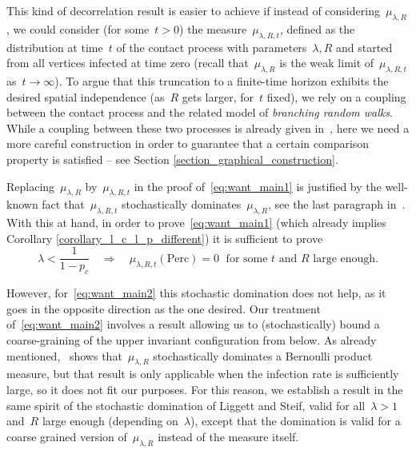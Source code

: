 \documentclass[a4paper,12pt]{article}
\begin{document}
\smallskip


This kind of decorrelation result is easier to achieve if instead of considering~$\mu_{\lambda,R}$, we could consider (for some~$t > 0$) the measure~$\mu_{\lambda,R,t}$, defined as the distribution at time~$t$ of the contact process with parameters~$\lambda,R$ and started from all vertices infected at time zero (recall that~$\mu_{\lambda,R}$ is the weak limit of~$\mu_{\lambda,R,t}$ as~$t\to \infty$). To argue that this truncation to a finite-time horizon exhibits the desired spatial independence (as~$R$ gets larger, for~$t$ fixed), we rely on a coupling between the contact process and the related model of \textit{branching random walks}. While a coupling between these two processes is already given in~\cite[page 34]{Li99}, here we need a more careful construction in order to guarantee that a certain comparison property is satisfied -- see Section \ref{section_graphical_construction}.



\smallskip



Replacing~$\mu_{\lambda,R}$ by~$\mu_{\lambda,R,t}$ in the proof of~\eqref{eq:want_main1} is justified by the well-known fact that~$\mu_{\lambda,R,t}$ stochastically dominates~$\mu_{\lambda,R}$, see the last paragraph in~\cite[page 34]{Li99}. With this at hand, in order to prove~\eqref{eq:want_main1} (which already implies Corollary \ref{corollary_l_c_l_p_different}) it is sufficient to prove
$$\lambda < \frac{1}{1-p_c} \quad \Longrightarrow \quad \mu_{\lambda, R,t}(\mathrm{Perc}) = 0 \; \text{ for some $t$ and $R$ large enough.}$$

However, for~\eqref{eq:want_main2} this stochastic domination does not help, as it goes in the opposite direction as the one desired. Our treatment of~\eqref{eq:want_main2} involves a result allowing us to (stochastically) bound a coarse-graining of the upper invariant configuration from below. As already mentioned,~\cite[Theorem~2.1]{LS06} shows that~$\mu_{\lambda,R}$ stochastically dominates a Bernoulli product measure, but that result is only applicable when the infection rate is sufficiently large, so it does not fit our purposes. For this reason, we establish a result in the same spirit of the stochastic domination of Liggett and Steif, valid for all~$\lambda > 1$ and~$R$ large enough (depending on~$\lambda$), except that the domination is valid for a coarse grained version of~$\mu_{\lambda,R}$ instead of the measure itself.
\end{document}
